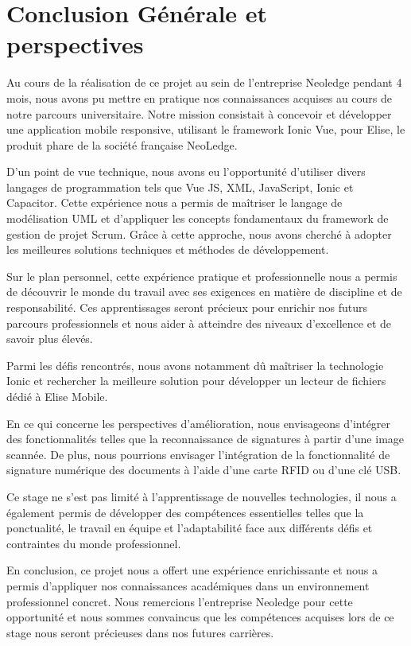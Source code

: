 \chapter*{Conclusion Générale et perspectives}
\label{sec:conclusion}


Au cours de la réalisation de ce projet au sein de l'entreprise Neoledge pendant 4 mois, nous avons pu mettre en pratique nos connaissances acquises au cours de notre parcours universitaire. Notre mission consistait à concevoir et développer une application mobile responsive, utilisant le framework Ionic Vue, pour Elise, le produit phare de la société française NeoLedge. 

\medskip

D'un point de vue technique, nous avons eu l'opportunité d'utiliser divers langages de programmation tels que Vue JS, XML, JavaScript, Ionic et Capacitor. Cette expérience nous a permis de maîtriser le langage de modélisation UML et d'appliquer les concepts fondamentaux du framework de gestion de projet Scrum. Grâce à cette approche, nous avons cherché à adopter les meilleures solutions techniques et méthodes de développement. 

\medskip

Sur le plan personnel, cette expérience pratique et professionnelle nous a permis de découvrir le monde du travail avec ses exigences en matière de discipline et de responsabilité. Ces apprentissages seront précieux pour enrichir nos futurs parcours professionnels et nous aider à atteindre des niveaux d'excellence et de savoir plus élevés. 

\medskip

Parmi les défis rencontrés, nous avons notamment dû maîtriser la technologie Ionic et rechercher la meilleure solution pour développer un lecteur de fichiers dédié à Elise Mobile. 

\medskip

En ce qui concerne les perspectives d'amélioration, nous envisageons d'intégrer des fonctionnalités telles que la reconnaissance de signatures à partir d'une image scannée. De plus, nous pourrions envisager l'intégration de la fonctionnalité de signature numérique des documents à l'aide d'une carte RFID ou d'une clé USB. 

\medskip

Ce stage ne s'est pas limité à l'apprentissage de nouvelles technologies, il nous a également permis de développer des compétences essentielles telles que la ponctualité, le travail en équipe et l'adaptabilité face aux différents défis et contraintes du monde professionnel. 

\medskip

En conclusion, ce projet nous a offert une expérience enrichissante et nous a permis d'appliquer nos connaissances académiques dans un environnement professionnel concret. Nous remercions l'entreprise Neoledge pour cette opportunité et nous sommes convaincus que les compétences acquises lors de ce stage nous seront précieuses dans nos futures carrières. 